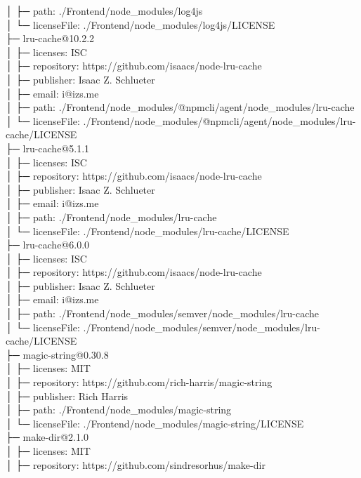 │  ├─ path: ./Frontend/node\_modules/log4js\\
│  └─ licenseFile: ./Frontend/node\_modules/log4js/LICENSE\\
├─ lru-cache@10.2.2\\
│  ├─ licenses: ISC\\
│  ├─ repository: https://github.com/isaacs/node-lru-cache\\
│  ├─ publisher: Isaac Z. Schlueter\\
│  ├─ email: i@izs.me\\
│  ├─ path: ./Frontend/node\_modules/@npmcli/agent/node\_modules/lru-cache\\
│  └─ licenseFile: ./Frontend/node\_modules/@npmcli/agent/node\_modules/lru-cache/LICENSE\\
├─ lru-cache@5.1.1\\
│  ├─ licenses: ISC\\
│  ├─ repository: https://github.com/isaacs/node-lru-cache\\
│  ├─ publisher: Isaac Z. Schlueter\\
│  ├─ email: i@izs.me\\
│  ├─ path: ./Frontend/node\_modules/lru-cache\\
│  └─ licenseFile: ./Frontend/node\_modules/lru-cache/LICENSE\\
├─ lru-cache@6.0.0\\
│  ├─ licenses: ISC\\
│  ├─ repository: https://github.com/isaacs/node-lru-cache\\
│  ├─ publisher: Isaac Z. Schlueter\\
│  ├─ email: i@izs.me\\
│  ├─ path: ./Frontend/node\_modules/semver/node\_modules/lru-cache\\
│  └─ licenseFile: ./Frontend/node\_modules/semver/node\_modules/lru-cache/LICENSE\\
├─ magic-string@0.30.8\\
│  ├─ licenses: MIT\\
│  ├─ repository: https://github.com/rich-harris/magic-string\\
│  ├─ publisher: Rich Harris\\
│  ├─ path: ./Frontend/node\_modules/magic-string\\
│  └─ licenseFile: ./Frontend/node\_modules/magic-string/LICENSE\\
├─ make-dir@2.1.0\\
│  ├─ licenses: MIT\\
│  ├─ repository: https://github.com/sindresorhus/make-dir\\
